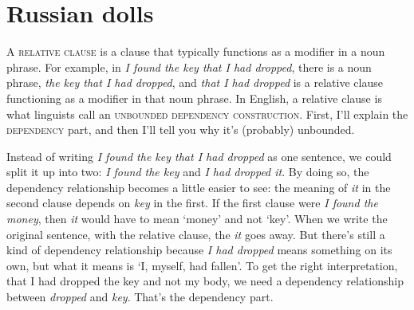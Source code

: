 \ea
    \z
\z
\ea
    \z
\z
\ea
    \z
\z
\ea
    \z
\z
\ea
    \z
\z
\ea
    \z
\z
\ea
    \z
\z

\section{Russian dolls} \label{sec:dolls}

A \textsc{relative clause} is a clause that typically functions as a modifier in a noun phrase. For example, in \textit{I found the key that I had dropped}, there is a noun phrase, \textit{the key that I had dropped}, and \textit{that I had dropped} is a relative clause functioning as a modifier in that noun phrase. In English, a relative clause is what linguists call an \textsc{unbounded dependency construction}. First, I'll explain the \textsc{dependency} part, and then I'll tell you why it's (probably) unbounded.

Instead of writing \textit{I found the key that I had dropped} as one sentence, we could split it up into two: \textit{I found the key} and \textit{I had dropped it}. By doing so, the dependency relationship becomes a little easier to see: the meaning of \textit{it} in the second clause depends on \textit{key} in the first. If the first clause were \textit{I found the money}, then \textit{it} would have to mean `money' and not `key'. When we write the original sentence, with the relative clause, the \textit{it} goes away. But there's still a kind of dependency relationship because \textit{I had dropped} means something on its own, but what it means is `I, myself, had fallen'. To get the right interpretation, that I had dropped the key and not my body, we need a dependency relationship between \textit{dropped} and \textit{key}. That's the dependency part.

